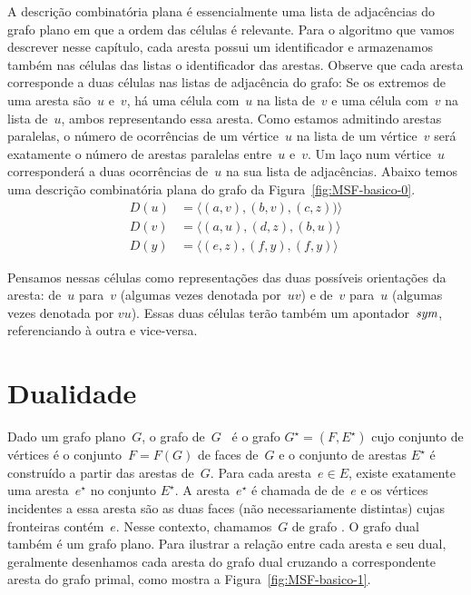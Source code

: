 A descrição combinatória plana é essencialmente uma lista de adjacências do grafo plano em que a ordem das células é relevante.
Para o algoritmo que vamos descrever nesse capítulo, cada aresta possui um identificador e armazenamos também nas células das listas o identificador das arestas.
Observe que cada aresta corresponde a duas células nas listas de adjacência do grafo:
Se os extremos de uma aresta são~$u$ e~$v$, há uma célula com~$u$ na lista de~$v$ e uma célula com~$v$ na lista de~$u$, ambos representando essa aresta.
Como estamos admitindo arestas paralelas, o número de ocorrências de um vértice~$u$ na lista de um vértice~$v$ será exatamente o número de arestas paralelas entre~$u$ e~$v$.
Um laço num vértice~$u$ corresponderá a duas ocorrências de~$u$ na sua lista de adjacências.
Abaixo temos uma descrição combinatória plana do grafo da Figura~\ref{fig:MSF-basico-0}.
\begin{align*}
D(u)&=\langle (a,v), (b,v), (c,z))\rangle\\
D(v)&=\langle (a,u), (d,z), (b,u)  \rangle\\
D(y)&=\langle (e,z), (f,y), (f,y) \rangle
\end{align*}

Pensamos nessas células como representações das duas possíveis orientações da aresta: de~$u$ para~$v$ (algumas vezes denotada por~$uv$) e de~$v$ para~$u$ (algumas vezes denotada por $vu$).
Essas duas células terão também um apontador~$\textit{sym}$, referenciando à outra e vice-versa.

\section{Dualidade}
\label{sec:dualidade}


Dado um grafo plano~$G$, o grafo  de~$G$~\cite{Diestel} é o grafo $G^\star = (F,E^\star)$ cujo conjunto de vértices é o conjunto~$F = F(G)$ de faces de~$G$ e o conjunto de arestas $E^\star$ é construído a partir das arestas de~$G$.
Para cada aresta~$e\in E$, existe exatamente uma aresta~$e^\star$ no conjunto $E^\star$.
A aresta~$e^\star$ é chamada de  de~$e$ e os vértices incidentes a essa aresta são as duas faces (não necessariamente distintas) cujas fronteiras contém~$e$.
Nesse contexto, chamamos~$G$ de grafo .
O grafo dual também é um grafo plano.
Para ilustrar a relação entre cada aresta e seu dual, geralmente desenhamos cada aresta do grafo dual cruzando a correspondente aresta do grafo primal, como mostra a Figura~\ref{fig:MSF-basico-1}.

